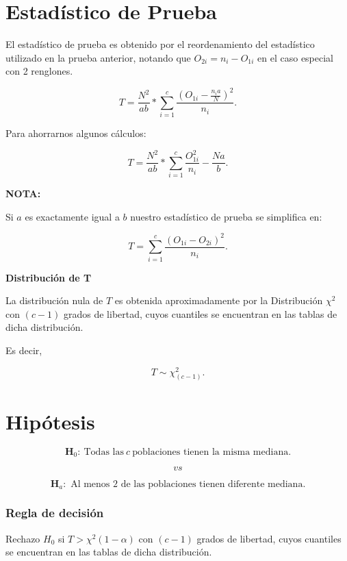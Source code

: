 \documentclass[
  a4paper,
  oneside,
  openany]{book}
\begin{document}
\hypertarget{estaduxedstico-de-prueba-12}{%
\section{Estadístico de Prueba}\label{estaduxedstico-de-prueba-12}}

El estadístico de prueba es obtenido por el reordenamiento del estadístico utilizado en la prueba anterior, notando que \(O_{2i}=n_{i}-O_{1i}\) en el caso especial con 2 renglones.

\[T=\frac{N^2}{ab}*\sum^{c}_{i=1}\frac{(O_{1i}-\frac{n_{i}a}{N})^2}{n_i}.\]

Para ahorrarnos algunos cálculos:

\[T=\frac{N^2}{ab}*\sum^{c}_{i=1}\frac{O_{1i}^2}{n_i}-\frac{Na}{b}.\]

\textbf{NOTA:}

Si \(a\) es exactamente igual a \(b\) nuestro estadístico de prueba se simplifica en:

\[T=\sum^{c}_{i=1}\frac{(O_{1i}-O_{2i})^2}{n_i}.\]

\textbf{Distribución de T}

La distribución nula de \(T\) es obtenida aproximadamente por la Distribución \(\chi^2\) con \((c-1)\) grados de libertad, cuyos cuantiles se encuentran en las tablas de dicha distribución.

Es decir,

\[T\sim \chi^2_{(c-1)}.\]

\hypertarget{hipuxf3tesis-11}{%
\section{Hipótesis}\label{hipuxf3tesis-11}}

\[\textbf{H}_0: \ \mbox{Todas las} \  c \  \mbox{poblaciones tienen la misma mediana.}\]

\[vs\]

\[\textbf{H}_a:\mbox{ Al menos 2 de las poblaciones tienen diferente mediana.}\]

\hypertarget{regla-de-decisiuxf3n-26}{%
\subsubsection*{Regla de decisión}\label{regla-de-decisiuxf3n-26}}


Rechazo \(H_0\) si \(T> \chi^2(1-\alpha)\) con \((c-1)\) grados de libertad, cuyos cuantiles se encuentran en las tablas de dicha distribución.
\end{document}
